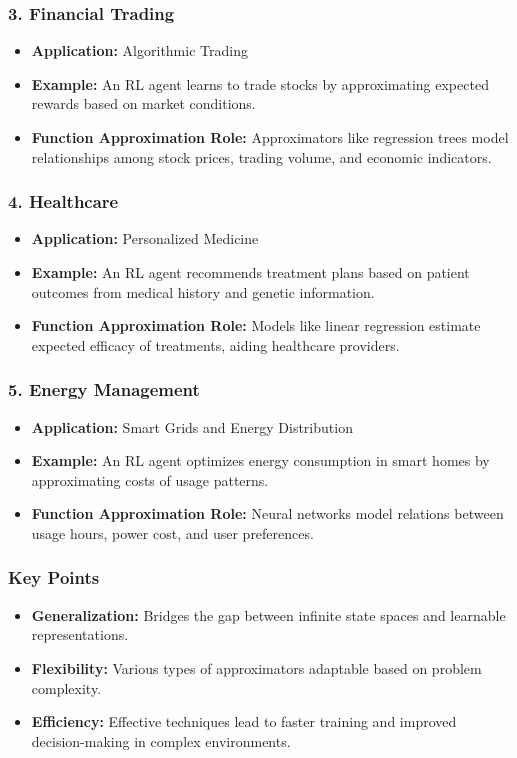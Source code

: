 \documentclass[aspectratio=169]{beamer}
\begin{document}
\begin{frame}[fragile]
    \frametitle{3. Financial Trading}
    \begin{itemize}
        \item \textbf{Application:} Algorithmic Trading
        \item \textbf{Example:} An RL agent learns to trade stocks by approximating expected rewards based on market conditions.
        \item \textbf{Function Approximation Role:} Approximators like regression trees model relationships among stock prices, trading volume, and economic indicators.
    \end{itemize}
\end{frame}

\begin{frame}[fragile]
    \frametitle{4. Healthcare}
    \begin{itemize}
        \item \textbf{Application:} Personalized Medicine
        \item \textbf{Example:} An RL agent recommends treatment plans based on patient outcomes from medical history and genetic information.
        \item \textbf{Function Approximation Role:} Models like linear regression estimate expected efficacy of treatments, aiding healthcare providers.
    \end{itemize}
\end{frame}

\begin{frame}[fragile]
    \frametitle{5. Energy Management}
    \begin{itemize}
        \item \textbf{Application:} Smart Grids and Energy Distribution
        \item \textbf{Example:} An RL agent optimizes energy consumption in smart homes by approximating costs of usage patterns.
        \item \textbf{Function Approximation Role:} Neural networks model relations between usage hours, power cost, and user preferences.
    \end{itemize}
\end{frame}

\begin{frame}[fragile]
    \frametitle{Key Points}
    \begin{itemize}
        \item \textbf{Generalization:} Bridges the gap between infinite state spaces and learnable representations.
        \item \textbf{Flexibility:} Various types of approximators adaptable based on problem complexity.
        \item \textbf{Efficiency:} Effective techniques lead to faster training and improved decision-making in complex environments.
    \end{itemize}
\end{frame}
\end{document}
